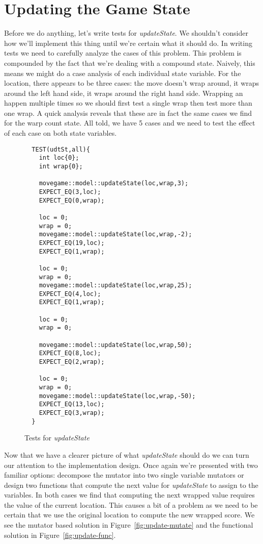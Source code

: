 \documentclass[nobib]{tufte-handout}
\begin{document}
\section{Updating the Game State}

Before we do anything, let's write tests for \textit{updateState}. We shouldn't consider how we'll implement this thing until we're certain what it should do. In writing tests we need to carefully analyze the cases of this problem. This problem is compounded by the fact that we're dealing with a compound state. Naively, this means we might do a case analysis of each individual state variable. For the location, there appears to be three cases: the move doesn't wrap around, it wraps around the left hand side, it wraps around the right hand side. Wrapping an happen multiple times so we should first test a single wrap then test more than one wrap. A quick analysis reveals that these are in fact the same cases we find for the warp count state. All told, we have 5 cases and we need to test the effect of each case on both state variables.

\begin{figure}[!htbp]
\begin{lstlisting}
  TEST(udtSt,all){
    int loc{0};
    int wrap{0};

    movegame::model::updateState(loc,wrap,3);
    EXPECT_EQ(3,loc);
    EXPECT_EQ(0,wrap);

    loc = 0;
    wrap = 0;
    movegame::model::updateState(loc,wrap,-2);
    EXPECT_EQ(19,loc);
    EXPECT_EQ(1,wrap);

    loc = 0;
    wrap = 0;
    movegame::model::updateState(loc,wrap,25);
    EXPECT_EQ(4,loc);
    EXPECT_EQ(1,wrap);

    loc = 0;
    wrap = 0;

    movegame::model::updateState(loc,wrap,50);
    EXPECT_EQ(8,loc);
    EXPECT_EQ(2,wrap);

    loc = 0;
    wrap = 0;
    movegame::model::updateState(loc,wrap,-50);
    EXPECT_EQ(13,loc);
    EXPECT_EQ(3,wrap);
  }
\end{lstlisting}
\caption{Tests for \textit{updateState}}
\label{fig:update-tests}
\end{figure}

Now that we have a clearer picture of what \textit{updateState} should do we can turn our attention to the implementation design. Once again we're presented with two familiar options: decompose the mutator into two single variable mutators or design two functions that compute the next value for \textit{updateState} to assign to the variables. In both cases we find that computing the next wrapped value requires the value of the current location. This causes a bit of a problem as we need to be certain that we use the original location to compute the new wrapped score. We see the mutator based solution in Figure~\ref{fig:update-mutate} and the functional solution in Figure~\ref{fig:update-func}.
\end{document}
